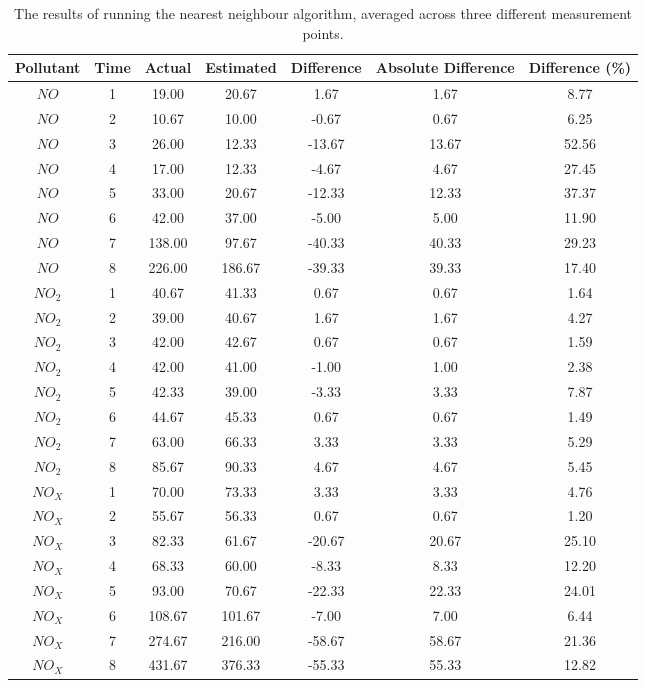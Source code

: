 	        \begin{table}[H]
	        	\centering
	    		\begin{tabular}{|c|c|c|c|c|c|c|}
	    			\hline
			        Pollutant & Time & Actual & Estimated & Difference & Absolute Difference & Difference (\%) \\ \hline
					$NO$ & 1 & 19.00 & 20.67 & 1.67 & 1.67 & 8.77 \\
					$NO$ & 2 & 10.67 & 10.00 & -0.67 & 0.67 & 6.25 \\
					$NO$ & 3 & 26.00 & 12.33 & -13.67 & 13.67 & 52.56 \\
					$NO$ & 4 & 17.00 & 12.33 & -4.67 & 4.67 & 27.45 \\
					$NO$ & 5 & 33.00 & 20.67 & -12.33 & 12.33 & 37.37 \\
					$NO$ & 6 & 42.00 & 37.00 & -5.00 & 5.00 & 11.90 \\
					$NO$ & 7 & 138.00 & 97.67 & -40.33 & 40.33 & 29.23 \\
					$NO$ & 8 & 226.00 & 186.67 & -39.33 & 39.33 & 17.40 \\
					$NO_{2}$ & 1 & 40.67 & 41.33 & 0.67 & 0.67 & 1.64 \\
					$NO_{2}$ & 2 & 39.00 & 40.67 & 1.67 & 1.67 & 4.27 \\
					$NO_{2}$ & 3 & 42.00 & 42.67 & 0.67 & 0.67 & 1.59 \\
					$NO_{2}$ & 4 & 42.00 & 41.00 & -1.00 & 1.00 & 2.38 \\
					$NO_{2}$ & 5 & 42.33 & 39.00 & -3.33 & 3.33 & 7.87 \\
					$NO_{2}$ & 6 & 44.67 & 45.33 & 0.67 & 0.67 & 1.49 \\
					$NO_{2}$ & 7 & 63.00 & 66.33 & 3.33 & 3.33 & 5.29 \\
					$NO_{2}$ & 8 & 85.67 & 90.33 & 4.67 & 4.67 & 5.45 \\
					$NO_{X}$ & 1 & 70.00 & 73.33 & 3.33 & 3.33 & 4.76 \\
					$NO_{X}$ & 2 & 55.67 & 56.33 & 0.67 & 0.67 & 1.20 \\
					$NO_{X}$ & 3 & 82.33 & 61.67 & -20.67 & 20.67 & 25.10 \\
					$NO_{X}$ & 4 & 68.33 & 60.00 & -8.33 & 8.33 & 12.20 \\
					$NO_{X}$ & 5 & 93.00 & 70.67 & -22.33 & 22.33 & 24.01 \\
					$NO_{X}$ & 6 & 108.67 & 101.67 & -7.00 & 7.00 & 6.44 \\
					$NO_{X}$ & 7 & 274.67 & 216.00 & -58.67 & 58.67 & 21.36 \\
					$NO_{X}$ & 8 & 431.67 & 376.33 & -55.33 & 55.33 & 12.82 \\ \hline
				\end{tabular}
				\caption{The results of running the nearest neighbour algorithm, averaged across three different measurement points.}
				\label{tab:nearest_neighbour_difference_results}
			\end{table}

